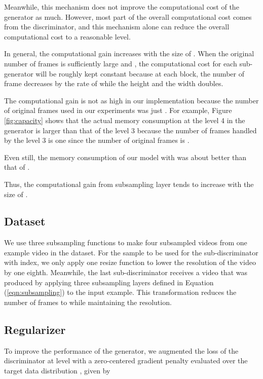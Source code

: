 \documentclass[twocolumn]{svjour3}
\def\Eq#1{Equation (\ref{eqn:#1})}
\def\Fig#1{Figure \ref{fig:#1}}
\begin{document}
Meanwhile, this mechanism does not improve the computational cost of the generator as much.
However, most part of the overall computational cost comes from the discriminator,
and this mechanism alone can reduce the overall computational cost to a reasonable level.














In general, the computational gain increases with the size of .
When the original number of frames is sufficiently large and , the computational cost for each sub-generator will be roughly kept constant because at each block, the number of frame decreases by the rate of  while the height and the width doubles.




The computational gain is not as high in our implementation because the number of original frames used in our experiments was just .
For example, \Fig{capacity} shows that the actual memory consumption at the level 4 in the generator is larger than that of the level 3 because the number of frames handled by the level 3 is one since the number of original frames is .

Even still, the memory consumption of our model with  was about  better than that of .



Thus, the computational gain from subsampling layer tends to increase with the size of .


\subsection{Dataset}
We use three subsampling functions to make four subsampled videos from one example video in the dataset. For the sample to be used for the sub-discriminator with index, we only apply one resize function to lower the resolution of the video by one eighth.
Meanwhile, the last sub-discriminator receives a video that was produced by applying three subsampling layers defined in \Eq{subsampling} to the input example.
This transformation reduces the number of frames to  while maintaining the resolution.


\subsection{Regularizer}
To improve the performance of the generator, we augmented the loss of the discriminator at level  with a zero-centered gradient penalty evaluated over the target data distribution \cite{Mescheder2018}, given by
\end{document}
